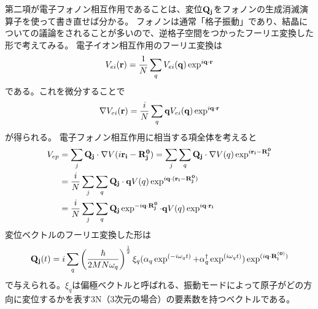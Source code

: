 \documentclass[letterpaper,10pt,dvipdfmx]{sphinxhowto}
\begin{document}
第二項が電子フォノン相互作用であることは、変位\(\bf{Q_j}\)をフォノンの生成消滅演算子を使って書き直せば分かる。
フォノンは通常「格子振動」であり、結晶についての議論をされることが多いので、逆格子空間をつかったフーリエ変換した形で考えてみる。
電子イオン相互作用のフーリエ変換は
\begin{equation*}
\begin{split}\begin{aligned}
V_{ei} ({\bf r}) = \frac{1}{N} \sum_{q} V_{ei}({\bf q})\exp^{i{\bf q\cdot r}}\end{aligned}\end{split}
\end{equation*}
である。これを微分することで
\begin{equation*}
\begin{split}\begin{aligned}
\nabla V_{ei} ({\bf r}) = \frac{i}{N} \sum_{q} {\bf q} V_{ei}({\bf
q})\exp^{i{\bf q\cdot r}}\end{aligned}\end{split}
\end{equation*}
が得られる。 電子フォノン相互作用に相当する項全体を考えると
\begin{equation*}
\begin{split}\begin{aligned}
V_{ep}&=\sum_j  {\bf Q_j}\cdot \nabla V(i{\bf r_i} - {\bf
R_j^{0}})=\sum_j \sum_q {\bf Q_j}\cdot \nabla V(q) \exp^{i{\bf r_i} - {\bf
R_j^{0}}} \nonumber \\
&=\frac{i}{N} \sum_j \sum_q
{\bf Q_j}\cdot  {\bf q}V(q) \exp^{i{\bf q} \cdot ({\bf r_i} - {\bf R_j^{0}})}
\nonumber
\\
&= \frac{i}{N} \sum_j \sum_q {\bf Q_j} \exp^{-i{\bf q} \cdot {\bf
R_j^{0}}}\cdot  {\bf q}V(q) \exp^{i {\bf q} \cdot{\bf r_i}}\end{aligned}\end{split}
\end{equation*}
変位ベクトルのフーリエ変換した形は
\begin{equation*}
\begin{split}\begin{aligned}
{\bf Q_j}(t)=i\sum_q \left(\frac{\hbar}{2MN\omega_q} \right)^\frac{1}{2} \xi_q
(\alpha_q \exp^{(-i\omega_q t)}+\alpha_q^\dagger \exp^{(i\omega_q t)})
\exp^{(i{\bf q\cdot R_i^{(0)}})}\end{aligned}\end{split}
\end{equation*}
で与えられる。\(\xi_q\)は偏極ベクトルと呼ばれる、振動モードによって原子がどの方向に変位するかを表す3N（3次元の場合）の要素数を持つベクトルである。
\end{document}
